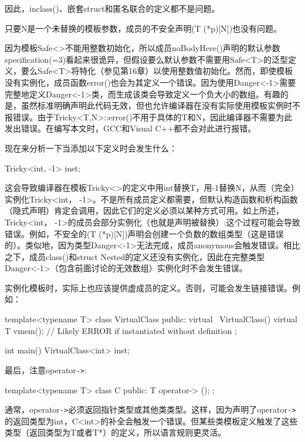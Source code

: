 因此，inclass()、嵌套struct和匿名联合的定义都不是问题。

只要N是一个未替换的模板参数，成员的不安全声明(T (*p)[N])也没有问题。

因为模板Safe<>不能用整数初始化，所以成员noBodyHere()声明的默认参数specification(=3)看起来很诡异，但假设要么默认参数不需要用Safe<T>的泛型定义，要么Safe<T>将特化（参见第16章）以使用整数值初始化。然而，即使模板没有实例化，成员函数error()也会为其定义一个错误。因为使用Danger<-1>需要完整地定义Danger<-1>类，而生成该类会导致定义一个负大小的数组。有趣的是，虽然标准明确声明此代码无效，但也允许编译器在没有实际使用模板实例时不报错误。由于Tricky<T,N>::error()不用于具体的T和N，因此编译器不需要为此发出错误。在编写本文时，GCC和Visual C++都不会对此进行报错。

现在来分析一下当添加以下定义时会发生什么：

\begin{cpp}
Tricky<int, -1> inst;
\end{cpp}

这会导致编译器在模板Tricky<>的定义中用int替换T，用-1替换N，从而（完全）实例化Tricky<int， -1>。不是所有成员定义都需要，但默认构造函数和析构函数（隐式声明）肯定会调用，因此它们的定义必须以某种方式可用。如上所述，Tricky<int， -1>的成员会部分实例化（也就是声明被替换）:这个过程可能会导致错误。例如，不安全的(T (*p)[N])声明会创建一个负数的数组类型（这是错误的）。类似地，因为类型Danger<-1>无法完成，成员anonymous会触发错误。相比之下，成员class()和struct Nested的定义还没有实例化，因此在完整类型Danger<-1>（包含前面讨论的无效数组）实例化时不会发生错误。

实例化模板时，实际上也应该提供虚成员的定义。否则，可能会发生链接错误。例如：

\begin{cpp}
template<typename T>
class VirtualClass {
	public:
	virtual ~VirtualClass() {}
	virtual T vmem(); // Likely ERROR if instantiated without definition
};

int main() {
	VirtualClass<int> inst;
}
\end{cpp}

最后，注意operator\texttt{->}:

\begin{cpp}
template<typename T>
class C {
	public:
	T operator-> ();
};
\end{cpp}

通常，operator\texttt{->}必须返回指针类型或其他类类型。这样，因为声明了operator\texttt{->}的返回类型为int，C<int>的补全会触发一个错误。但某些类模板定义触发了这些类型（返回类型为T或者T*）的定义，所以语言规则更灵活。

